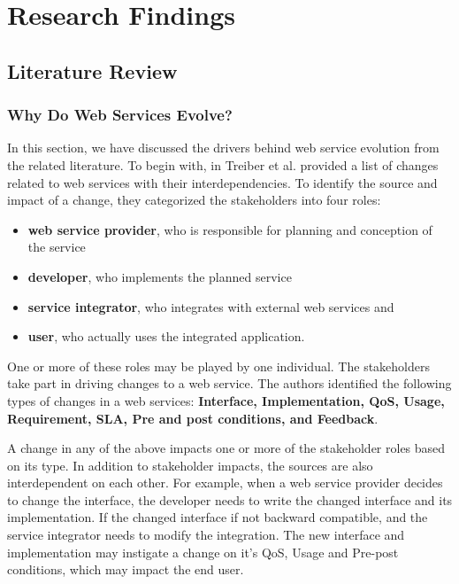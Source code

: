 \documentclass[runningheads,a4paper]{llncs}
\begin{document}
\section{Research Findings} %
\label{sec:research_findings}

\subsection{Literature Review} %
\label{sub:literature_review}

\subsubsection{Why Do Web Services Evolve?} %
\label{sub:why_do_web_services_change}
In this section, we have discussed the drivers behind web service evolution from the related literature. To begin with, in \cite{treiber2009analyzing} Treiber et al. provided a list of changes related to web services with their interdependencies. To identify the source and impact of a change, they categorized the stakeholders into four roles:

\begin{itemize}
  \item \textbf{web service provider}, who is responsible for planning and conception of the service
  \item \textbf{developer}, who implements the planned service
  \item \textbf{service integrator}, who integrates with external web services and
  \item \textbf{user}, who actually uses the integrated application.
\end{itemize}

One or more of these roles may be played by one individual. The stakeholders take part in driving changes to a web service. The authors identified the following types of changes in a web services: \textbf{Interface, Implementation, QoS, Usage, Requirement, SLA, Pre and post conditions, and Feedback}.

A change in any of the above impacts one or more of the stakeholder roles based on its type. In addition to stakeholder impacts, the sources are also interdependent on each other. For example, when a web service provider decides to change the interface, the developer needs to write the changed interface and its implementation. If the changed interface if not backward compatible, and the service integrator needs to modify the integration. The new interface and implementation may instigate a change on it’s QoS, Usage and Pre-post conditions, which may impact the end user.
\end{document}
